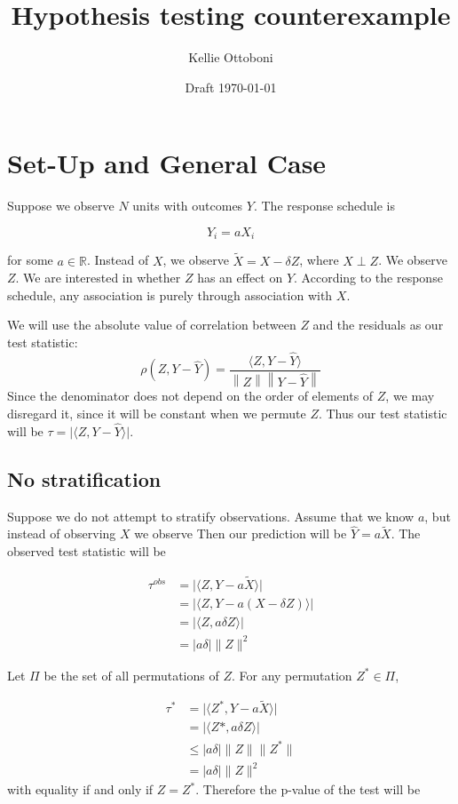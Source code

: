 \documentclass[12pt]{article}
\title{Hypothesis testing counterexample}
\author{Kellie Ottoboni}
\date{Draft \today}
\newcommand{\reals}{\mathbb{R}}
\begin{document}
\maketitle


\section{Set-Up and General Case}
Suppose we observe $N$ units with outcomes $Y$.
The response schedule is

$$Y_i = a X_i$$

\noindent for some $a \in \reals$.
Instead of $X$, we observe $\tilde{X} = X - \delta Z$, where $X \perp Z$.
We observe $Z$.
We are interested in whether $Z$ has an effect on $Y$.
According to the response schedule, any association is purely through association with $X$.

We will use the absolute value of correlation between $Z$ and the residuals as our test statistic:
$$\rho(Z, Y - \hat{Y}) = \frac{\langle Z, Y- \hat{Y} \rangle}{\left\lVert Z \right\rVert \left\lVert Y - \hat{Y} \right\rVert}$$
Since the denominator does not depend on the order of elements of $Z$, we may disregard it, since it will be constant when we permute $Z$. 
Thus our test statistic will be $\tau =\lvert \langle Z, Y-\hat{Y}\rangle\rvert$.

\subsection{No stratification}
Suppose we do not attempt to stratify observations.
Assume that we know $a$, but instead of observing $X$ we observe
Then our prediction will be $\hat{Y} = a \tilde{X}$.
The observed test statistic will be

\begin{align*}
\tau^{obs} &= \lvert \langle Z, Y - a \tilde{X} \rangle \rvert \\
&= \lvert \langle Z, Y - a(X - \delta Z) \rangle \rvert \\
&= \lvert \langle Z, a\delta Z \rangle \rvert \\
&= \lvert a \delta \rvert \lVert Z \rVert^2
\end{align*}

Let $\Pi$ be the set of all permutations of $Z$.
For any permutation $Z^* \in \Pi$,

\begin{align*}
\tau^* &= \lvert \langle Z^*, Y - a \tilde{X} \rangle \rvert \\
&= \lvert \langle Z*, a\delta Z \rangle \rvert \\
&\leq \lvert a \delta \rvert \lVert Z \rVert \lVert Z^* \rVert \tag*{by Cauchy-Schwarz} \\
&= \lvert a \delta \rvert \lVert Z \rVert^2
\end{align*}
with equality if and only if $Z = Z^*$.
Therefore the p-value of the test will be
\end{document}
